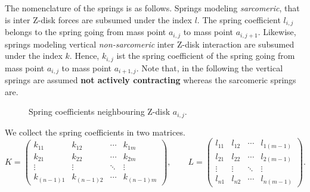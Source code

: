 The nomenclature of the springs is as follows. Springs modeling \textit{sarcomeric}, that is inter Z-disk forces are subsumed under the index $l$. The spring coefficient $l_{i,j}$ belongs to the spring going from mass point $a_{i,j}$ to mass point $a_{i,j+1}$. Likewise, springs modeling vertical \textit{non-sarcomeric} inter Z-disk interaction are subsumed under the index $k$.  Hence, $k_{i,j}$ ist the spring coefficient of the spring going from mass point $a_{i,j}$ to mass point $a_{i+1,j}$. Note that, in the following the vertical springs are assumed \textbf{not actively contracting} whereas the sarcomeric springs are.

\begin{figure}[H]
    \centering

\caption{Spring coefficients neighbouring Z-disk $a_{i,j}$.}
\end{figure}


We collect the spring coefficients in two matrices.
\begin{equation*}
	K=
\begin{pmatrix}
k_{11} & k_{12} & \cdots & k_{1m} \\
k_{21} & k_{22} & \cdots & k_{2m} \\
\vdots & \vdots & \ddots & \vdots \\
k_{(n-1)1} & k_{(n-1)2} & \cdots & k_{(n-1)m}
\end{pmatrix}, 
\qquad L = \begin{pmatrix}
l_{11} & l_{12} & \cdots & l_{1(m-1)} \\
l_{21} & l_{22} & \cdots & l_{2(m-1)} \\
\vdots & \vdots & \ddots & \vdots \\
l_{n1} & l_{n2} & \cdots & l_{n(m-1)}
\end{pmatrix}.
\end{equation*}

